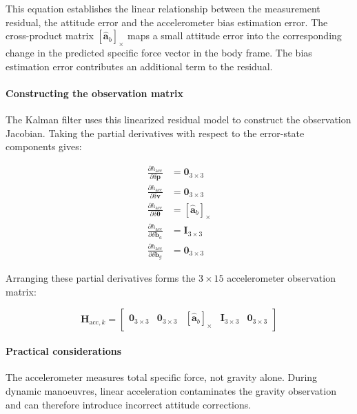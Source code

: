 \documentclass{article}
\begin{document}
	This equation establishes the linear relationship between the measurement residual, the attitude error and the accelerometer bias estimation error. The cross-product matrix $[\hat{\mathbf{a}}_b]_\times$ maps a small attitude error into the corresponding change in the predicted specific force vector in the body frame. The bias estimation error contributes an additional term to the residual.
	
	\paragraph{Constructing the observation matrix}
	
	The Kalman filter uses this linearized residual model to construct the observation Jacobian. Taking the partial derivatives with respect to the error-state components gives:
	
	\begin{align*}
		\frac{\partial h_{\text{acc}}}{\partial \delta\mathbf{p}}
		&= \mathbf{0}_{3\times3} \\[4pt]
		\frac{\partial h_{\text{acc}}}{\partial \delta\mathbf{v}}
		&= \mathbf{0}_{3\times3} \\[4pt]
		\frac{\partial h_{\text{acc}}}{\partial \delta\boldsymbol{\theta}}
		&= [\hat{\mathbf{a}}_b]_\times \\[4pt]
		\frac{\partial h_{\text{acc}}}{\partial \delta\mathbf{b}_a}
		&= \mathbf{I}_{3\times3} \\[4pt]
		\frac{\partial h_{\text{acc}}}{\partial \delta\mathbf{b}_g}
		&= \mathbf{0}_{3\times3}
	\end{align*}
	
	Arranging these partial derivatives forms the $3\times15$ accelerometer observation matrix:
	
	\begin{equation}
		\boxed{
			\mathbf{H}_{\text{acc},k} =
			\begin{bmatrix}
				\mathbf{0}_{3\times3} &
				\mathbf{0}_{3\times3} &
				[\hat{\mathbf{a}}_b]_\times &
				\mathbf{I}_{3\times3} &
				\mathbf{0}_{3\times3}
			\end{bmatrix}
		}
	\end{equation}
	
	\paragraph{Practical considerations}
	
	The accelerometer measures total specific force, not gravity alone. During dynamic manoeuvres, linear acceleration contaminates the gravity observation and can therefore introduce incorrect attitude corrections.
	
\end{document}
